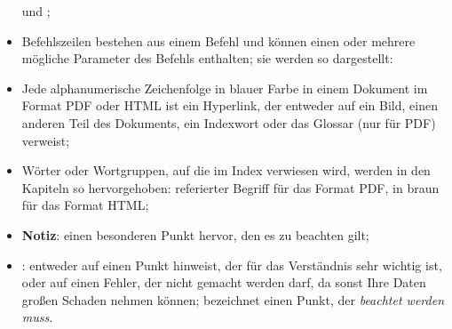 \begin{itemize}
		\newline
		\hspace*{1.5cm} und ;	
	\item Befehlszeilen bestehen aus einem Befehl und können einen oder mehrere mögliche Parameter des Befehls enthalten; sie werden so dargestellt:%
		\newline
		\hspace*{1.5cm}	
	\item Jede alphanumerische Zeichenfolge in blauer Farbe in einem Dokument im Format \gls{PDF} oder \gls{HTML} ist ein Hyperlink, der entweder auf ein Bild, einen anderen Teil des Dokuments, ein Indexwort oder das Glossar (nur für \gls{PDF}) verweist;%
	\item Wörter oder Wortgruppen, auf die im Index verwiesen wird, werden in den Kapiteln so hervorgehoben:%
		\newline
		\hspace*{1.5cm} \textopenbullet{}	\textsf{referierter Begriff} für das Format \gls{PDF}, %
		\newline 
		\hspace*{1.5cm} \textopenbullet{} in braun für das Format \gls{HTML};%
	\item \textbf{Notiz}: einen besonderen Punkt hervor, den es zu beachten gilt;
	\item \textcolor{red}{}: entweder auf einen Punkt hinweist, der für das Verständnis sehr wichtig ist, oder auf einen Fehler, der nicht gemacht werden darf, da sonst Ihre Daten großen Schaden nehmen können;\newline
	\textcolor{red}{} bezeichnet einen Punkt, der \emph{beachtet werden muss}.
\end{itemize}


